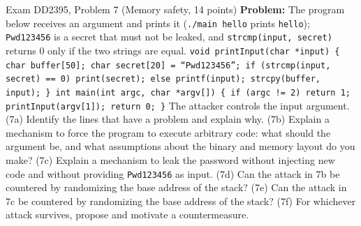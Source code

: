 \documentclass[12pt, a4paper]{article}
\begin{document}
\begin{practicebox}{Exam DD2395, Problem 7 (Memory safety, 14 points)}
\textbf{Problem:} The program below receives an argument and prints it (\texttt{./main hello} prints \texttt{hello}); \texttt{Pwd123456} is a secret that must not be leaked, and \texttt{strcmp(input, secret)} returns 0 only if the two strings are equal. \texttt{void printInput(char *input) \{ char buffer[50]; char secret[20] = ``Pwd123456''; if (strcmp(input, secret) == 0) print(secret); else printf(input); strcpy(buffer, input); \} int main(int argc, char *argv[]) \{ if (argc != 2) return 1; printInput(argv[1]); return 0; \}} The attacker controls the input argument. (7a) Identify the lines that have a problem and explain why. (7b) Explain a mechanism to force the program to execute arbitrary code: what should the argument be, and what assumptions about the binary and memory layout do you make? (7c) Explain a mechanism to leak the password without injecting new code and without providing \texttt{Pwd123456} as input. (7d) Can the attack in 7b be countered by randomizing the base address of the stack? (7e) Can the attack in 7c be countered by randomizing the base address of the stack? (7f) For whichever attack survives, propose and motivate a countermeasure.


\end{practicebox}
\end{document}
